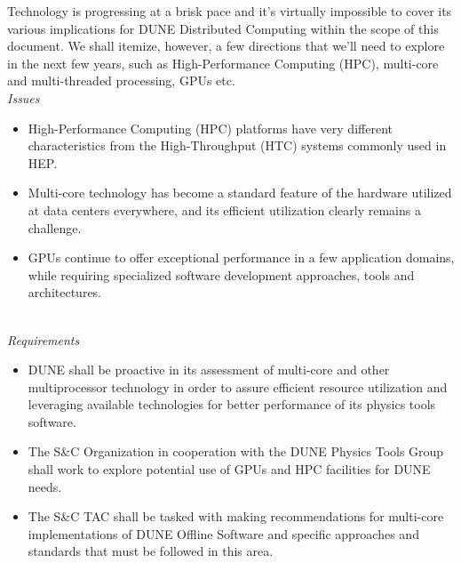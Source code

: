 Technology is progressing at a brisk pace and it's virtually impossible to cover its various implications for DUNE Distributed Computing within the scope of this document. We shall itemize, however, a few directions that we'll need to explore in the next few years, such as High-Performance Computing (HPC), multi-core and multi-threaded processing, GPUs etc.
\ 
\\
\textit{Issues}
\begin{itemize}
	\item High-Performance Computing (HPC) platforms have very different characteristics from the High-Throughput (HTC) systems commonly used in HEP.
	
	\item Multi-core technology has become a standard feature of the hardware utilized at data centers everywhere, and its efficient utilization clearly remains a challenge.
	
	\item GPUs continue to offer exceptional performance in a few application domains, while requiring specialized software development approaches, tools and architectures.
	
\end{itemize}
\ 
\\
\textit{Requirements}
\begin{itemize}
	\item DUNE shall be proactive in its assessment of multi-core and other multiprocessor technology in order to assure efficient resource utilization and leveraging available technologies for better performance of its physics tools software.
	
	\item The S\&C Organization in cooperation with the DUNE Physics Tools Group shall work to explore potential use of GPUs and HPC facilities for DUNE needs.
	
	\item The S\&C TAC shall be tasked with making recommendations for multi-core implementations of DUNE Offline Software and specific approaches and standards that must be followed in this area.
	
\end{itemize}

